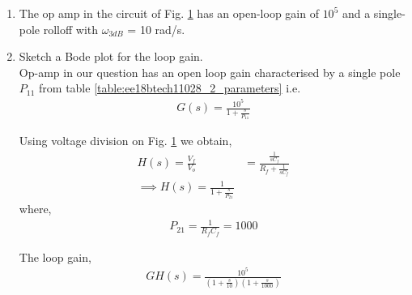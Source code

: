 \begin{enumerate}[label=\arabic*.,ref=\theenumi]
\item The op amp in the circuit of Fig. \ref{fig:ee18btech11028_2_q} has an open-loop gain of $10^{5}$ and a single-pole rolloff with $\omega_{3dB}$ = 10 rad/s.

%
\begin{figure}[!ht]
	\begin{center}
		\resizebox{\columnwidth}{!}{}
	\end{center}
\caption{}
\label{fig:ee18btech11028_2_q}
\end{figure}
%
\begin{table}[!ht]
    \centering
    
    \caption{}
    \label{table:ee18btech11028_2_parameters}
\end{table}

\item Sketch a Bode plot for the loop gain.
\\
\solution
Op-amp in our question has an open loop gain characterised by a single pole $P_{11} $ from table \ref{table:ee18btech11028_2_parameters} i.e.
\begin{align}
    G(s) = \frac{10^5}{1 + \frac{s}{P_{11}}}
        \label{eq:ee18btech11028_2_2}
\end{align}

Using voltage division on Fig. \ref{fig:ee18btech11028_2_q} we obtain,
\begin{align}
    H(s) = \frac{V_{f}}{V_{o}}
     &= \frac{\frac{1}{sC_{f}}}{R_{f} + \frac{1}{sC_{f}}}
    \\
    \implies H(s) = \frac{1}{1 + \frac{s}{P_{21}}}
        \label{eq:ee18btech11028_2_1}
\end{align}
where, 
\begin{align}
    P_{21} = \frac{1}{R_{f}C_{f}} = 1000
\end{align}

The loop gain, 
\begin{align}
    GH(s) = \frac{10^5}{(1+\frac{s}{10})(1 + \frac{s}{1000})}
\end{align}


\end{enumerate}
